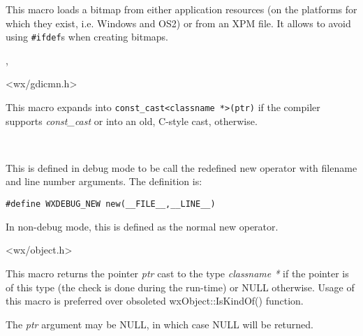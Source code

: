 \label{wxbitmapmacro}


This macro loads a bitmap from either application resources (on the platforms
for which they exist, i.e. Windows and OS2) or from an XPM file. It allows to
avoid using {\tt \#ifdef}s when creating bitmaps.


, 


<wx/gdicmn.h>

\label{wxconstcast}


This macro expands into {\tt const\_cast<classname *>(ptr)} if the compiler
supports {\it const\_cast} or into an old, C-style cast, otherwise.


\\

\label{debugnew}


This is defined in debug mode to be call the redefined new operator
with filename and line number arguments. The definition is:

\begin{verbatim}
#define WXDEBUG_NEW new(__FILE__,__LINE__)
\end{verbatim}

In non-debug mode, this is defined as the normal new operator.


<wx/object.h>

\label{wxdynamiccast}


This macro returns the pointer {\it ptr} cast to the type {\it classname *} if
the pointer is of this type (the check is done during the run-time) or NULL
otherwise. Usage of this macro is preferred over obsoleted wxObject::IsKindOf()
function.

The {\it ptr} argument may be NULL, in which case NULL will be returned.

